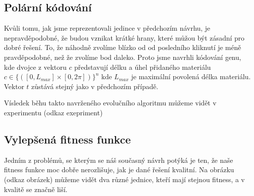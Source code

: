 \subsection{Polární kódování}

Kvůli tomu, jak jsme reprezentovali jedince v předchozím návrhu, je nepravděpodobné, že budou vznikat krátké hrany, které můžou být zásadní pro dobré řešení. To, že náhodně zvolíme blízko od od posledního kliknutí je méně pravděpodobné, než že zvolíme bod daleko. Proto jsme navrhli kódování genu, kde dvojce z vektoru $c$ představují délku a úhel přidaného materiálu $c \in \{([0, L_{max}] \times [0, 2 \pi])\}^n$ kde $L_{max}$ je maximální povolená délka materiálu. Vektor $t$ zůstává stejný jako v předchozím případě.

Vísledek běhu takto navrženého evolučního algoritmu můžeme vidět v experimentu (odkaz exepriment)

\subsection{Vylepšená fitness funkce}

Jedním z problémů, se kterým se náš současný návrh potýká je ten, že naše fitness funkce moc dobře nerozlišuje, jak je dané řešení kvalitní. Na obrázku (odkaz obrázek) můžeme vidět dva různé jednice, kteří mají stejnou fitness, a v kvalitě se značně liší.


